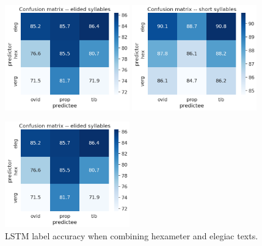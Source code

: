 \begin{figure}[H]
    \centering
    \includegraphics[width=0.48\textwidth]{img/lstm/lstm_label_accuracy_transfer_elision.png}
    \quad
    \includegraphics[width=0.48\textwidth]{img/lstm/lstm_label_accuracy_transfer_short.png}

    \includegraphics[width=0.48\textwidth]{img/lstm/lstm_label_accuracy_transfer_elision.png}

    \caption{LSTM label accuracy when combining hexameter and elegiac texts.}
    \label{fig:exp_architecture}
\end{figure}

